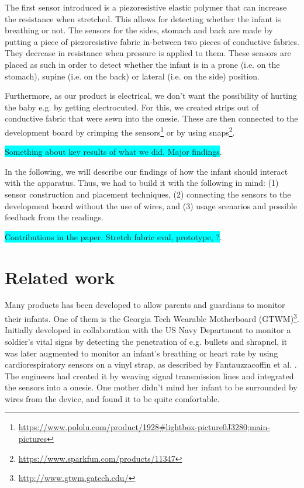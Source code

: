 \documentclass{sigchi-ext}
\begin{document}
The first sensor introduced is a piezoresistive elastic polymer that can increase the resistance when stretched. This allows for detecting whether the infant is breathing or not. The sensors for the sides, stomach and back are made by putting a piece of piezoresistive fabric in-between two pieces of conductive fabrics. They decrease in resistance when pressure is applied to them. These sensors are placed as such in order to detect whether the infant is in a prone (i.e. on the stomach), supine (i.e. on the back) or lateral (i.e. on the side) position.

Furthermore, as our product is electrical, we don't want the possibility of hurting the baby e.g. by getting electrocuted. For this, we created strips out of conductive fabric that were sewn into the onesie. These are then connected to the development board by crimping the sensors\footnote{\url{https://www.pololu.com/product/1928\#lightbox-picture0J3280;main-pictures}} or by using snaps\footnote{\url{https://www.sparkfun.com/products/11347}}.

\colorbox{cyan}{Something about key results of what we did. Major findings}.

In the following, we will describe our findings of how the infant should interact with the apparatus. Thus, we had to build it with the following in mind: (1) sensor construction and placement techniques, (2) connecting the sensors to the development board without the use of wires, and (3) usage scenarios and possible feedback from the readings.

\colorbox{cyan}{Contributions in the paper. Stretch fabric eval, prototype, ?}.

\section{Related work}
Many products has been developed to allow parents and guardians to monitor their infants. One of them is the Georgia Tech Wearable Motherboard (GTWM)\footnote{\url{http://www.gtwm.gatech.edu/}}. Initially developed in collaboration with the US Navy Department to monitor a soldier's vital signs by detecting the penetration of e.g. bullets and shrapnel, it was later augmented to monitor an infant's breathing or heart rate by using cardiorespiratory sensors on a vinyl strap, as described by Fantauzzacoffin et al. \cite{p285-fantauzzacoffin}. The engineers had created it by weaving signal transmission lines and integrated the sensors into a onesie. One mother didn't mind her infant to be surrounded by wires from the device, and found it to be quite comfortable.
\end{document}
